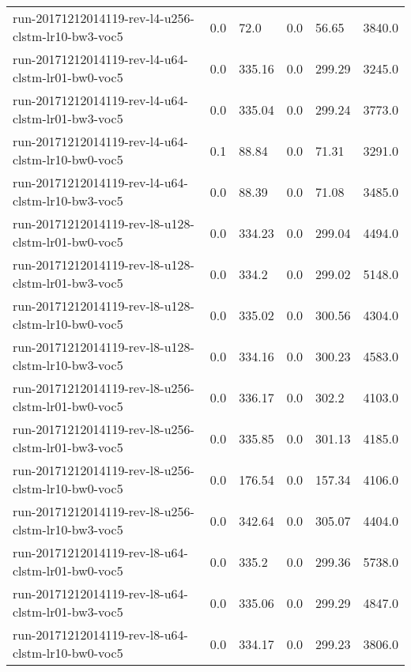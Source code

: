 \begin{landscape}
\begin{longtable}{p{.47\textheight} p{.08\textheight} p{.08\textheight} p{.08\textheight} p{.08\textheight} p{.08\textheight}}
    run-20171212014119-rev-l4-u256-clstm-lr10-bw3-voc5 & \num{0.0} & \num{72.0} & \num{0.0} & \num{56.65} & \num{3840.0}\\
    run-20171212014119-rev-l4-u64-clstm-lr01-bw0-voc5 & \num{0.0} & \num{335.16} & \num{0.0} & \num{299.29} & \num{3245.0}\\
    run-20171212014119-rev-l4-u64-clstm-lr01-bw3-voc5 & \num{0.0} & \num{335.04} & \num{0.0} & \num{299.24} & \num{3773.0}\\
    run-20171212014119-rev-l4-u64-clstm-lr10-bw0-voc5 & \num{0.1} & \num{88.84} & \num{0.0} & \num{71.31} & \num{3291.0}\\
    run-20171212014119-rev-l4-u64-clstm-lr10-bw3-voc5 & \num{0.0} & \num{88.39} & \num{0.0} & \num{71.08} & \num{3485.0}\\
    run-20171212014119-rev-l8-u128-clstm-lr01-bw0-voc5 & \num{0.0} & \num{334.23} & \num{0.0} & \num{299.04} & \num{4494.0}\\
    run-20171212014119-rev-l8-u128-clstm-lr01-bw3-voc5 & \num{0.0} & \num{334.2} & \num{0.0} & \num{299.02} & \num{5148.0}\\
    run-20171212014119-rev-l8-u128-clstm-lr10-bw0-voc5 & \num{0.0} & \num{335.02} & \num{0.0} & \num{300.56} & \num{4304.0}\\
    run-20171212014119-rev-l8-u128-clstm-lr10-bw3-voc5 & \num{0.0} & \num{334.16} & \num{0.0} & \num{300.23} & \num{4583.0}\\
    run-20171212014119-rev-l8-u256-clstm-lr01-bw0-voc5 & \num{0.0} & \num{336.17} & \num{0.0} & \num{302.2} & \num{4103.0}\\
    run-20171212014119-rev-l8-u256-clstm-lr01-bw3-voc5 & \num{0.0} & \num{335.85} & \num{0.0} & \num{301.13} & \num{4185.0}\\
    run-20171212014119-rev-l8-u256-clstm-lr10-bw0-voc5 & \num{0.0} & \num{176.54} & \num{0.0} & \num{157.34} & \num{4106.0}\\
    run-20171212014119-rev-l8-u256-clstm-lr10-bw3-voc5 & \num{0.0} & \num{342.64} & \num{0.0} & \num{305.07} & \num{4404.0}\\
    run-20171212014119-rev-l8-u64-clstm-lr01-bw0-voc5 & \num{0.0} & \num{335.2} & \num{0.0} & \num{299.36} & \num{5738.0}\\
    run-20171212014119-rev-l8-u64-clstm-lr01-bw3-voc5 & \num{0.0} & \num{335.06} & \num{0.0} & \num{299.29} & \num{4847.0}\\
    run-20171212014119-rev-l8-u64-clstm-lr10-bw0-voc5 & \num{0.0} & \num{334.17} & \num{0.0} & \num{299.23} & \num{3806.0}\\

\end{longtable}
\end{landscape}
